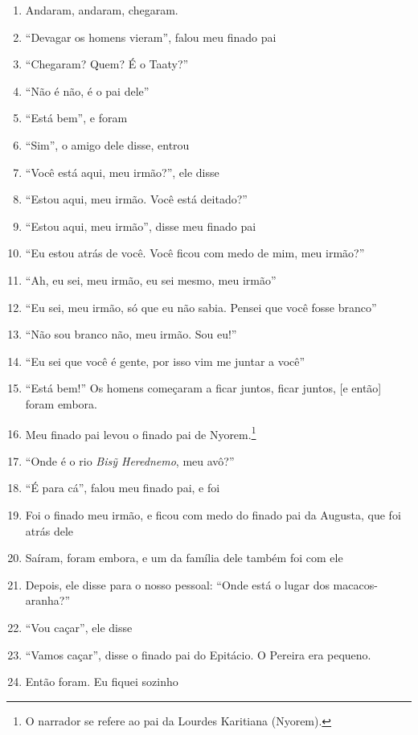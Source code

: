 \begin{enumerate}
 \item Andaram, andaram, chegaram.
 \item ``Devagar os homens vieram'', falou meu finado pai
 \item ``Chegaram? Quem? É o Taaty?''
 \item ``Não é não, é o pai dele''
 \item ``Está bem'', e foram
 \item ``Sim'', o amigo dele disse, entrou
 \item ``Você está aqui, meu irmão?'', ele disse
 \item ``Estou aqui, meu irmão. Você está deitado?''
 \item ``Estou aqui, meu irmão'', disse meu finado pai
 \item ``Eu estou atrás de você. Você ficou com medo de mim, meu irmão?''
 \item ``Ah, eu sei, meu irmão, eu sei mesmo, meu irmão''
 \item ``Eu sei, meu irmão, só que eu não sabia. Pensei que você fosse branco''
 \item ``Não sou branco não, meu irmão. Sou eu!''
 \item ``Eu sei que você é gente, por isso vim me juntar a você''
 \item ``Está bem!'' Os homens começaram a ficar juntos, ficar juntos, {[}e então{]} foram embora.
 \begin{center}\end{center}
 \item Meu finado pai levou o finado pai de Nyorem.\footnote{O narrador se
   refere ao pai da Lourdes Karitiana (Nyorem).}
 \item ``Onde é o rio \textit{Bisỹ Herednemo}, meu avô?''
 \item ``É para cá'', falou meu finado pai, e foi
 \item Foi o finado meu irmão, e ficou com medo do finado pai da Augusta,
 que foi atrás dele
 \item Saíram, foram embora, e um da família dele também foi com ele
 \item Depois, ele disse para o nosso pessoal: ``Onde está o lugar dos
 macacos- aranha?''
 \item ``Vou caçar'', ele disse
 \item ``Vamos caçar'', disse o finado pai do Epitácio. O Pereira era pequeno.
 \item Então foram. Eu fiquei sozinho
 \begin{center}\end{center}

\end{enumerate}
